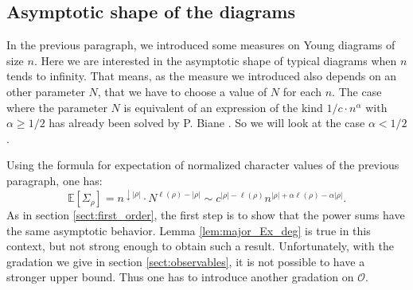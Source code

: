 \documentclass[10pt]{amsart}
\theoremstyle{remark}
\newcommand{\esper}{\mathbb{E}}
\newcommand{\obs}{\mathscr{O}}
\begin{document}
\subsection{Asymptotic shape of the diagrams}
In the previous paragraph, we introduced some measures on Young diagrams of size $n$. Here we are interested in the asymptotic shape of typical diagrams when $n$ tends to infinity. That means, as the measure we introduced also depends on an other parameter $N$, that we have to choose a value of $N$ for each $n$. The case where the parameter $N$ is equivalent of an expression of the kind $1/c \cdot n^\alpha$ with $\alpha \geq 1/2$ has already been solved by P. Biane \cite[paragraph 3.1]{Bia01}. So we will look at the case $\alpha < 1/2$.\bigskip

Using the formula for expectation of normalized character values of the previous paragraph, one has:
\begin{equation}\label{eq:equiv_Esigma}
\esper[\varSigma_\rho] = n^{\downarrow |\rho|} \cdot N^{\ell(\rho)-|\rho|} \sim c^{|\rho| - \ell(\rho)} n^{|\rho| + \alpha \ell(\rho) -\alpha |\rho|}.
\end{equation}
As in section \ref{sect:first_order}, the first step is to show that the power sums have the same asymptotic behavior. Lemma \ref{lem:major_Ex_deg} is true in this context, but not strong enough to obtain such a result. Unfortunately, with the gradation we give in section \ref{sect:observables}, it is not possible to have a stronger upper bound. Thus one has to introduce another gradation on $\obs$.\bigskip
\end{document}
